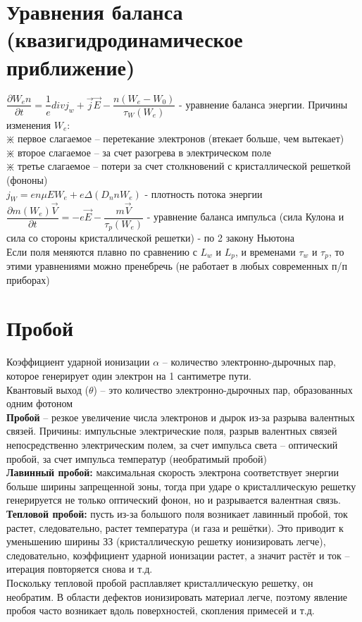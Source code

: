 \begin{multicols*}{2}
		\section{Уравнения баланса (квазигидродинамическое приближение)}
		$\dfrac{\partial W_e n}{\partial t} = \dfrac{1}{e} div j_w + \vec{j}\vec{E} - \dfrac{n(W_e - W_0)}{\tau_W(W_e)}$ - уравнение баланса энергии. Причины изменения $W_e$:\\
		$\divideontimes$ первое слагаемое – перетекание электронов (втекает больше, чем вытекает)\\
		$\divideontimes$ второе слагаемое – за счет разогрева в электрическом поле\\
		$\divideontimes$ третье слагаемое – потери за счет столкновений с кристаллической решеткой (фононы)\\
		$j_W = en \mu E W_e + e \Delta(D_n n W_e)$ - плотность потока энергии\\
		$\dfrac{\partial m (W_e) \vec{V}}{\partial t} = -e\vec{E} - \dfrac{m\vec{V}}{\tau_p(W_e)}$ - уравнение баланса импульса (сила Кулона и сила со стороны кристаллической решетки) - по 2 закону Ньютона \\
		Если поля меняются плавно по сравнению с $L_w$ и $L_p$, и временами $\tau_w$ и $\tau_p$, то этими уравнениями можно пренебречь (не работает в любых современных п/п приборах)

		\section{Пробой}
		Коэффициент ударной ионизации $\alpha$ – количество электронно-дырочных пар, которое генерирует один электрон на 1 сантиметре пути.\\
		Квантовый выход ($\theta$) – это количество электронно-дырочных пар, образованных одним фотоном\\
		\textbf{Пробой} – резкое увеличение числа электронов и дырок из-за разрыва валентных связей. Причины: импульсные электрические поля, разрыв валентных связей непосредственно электрическим полем, за счет импульса света – оптический пробой, за счет импульса температур (необратимый пробой)\\
		\textbf{Лавинный пробой:} максимальная скорость электрона соответствует энергии больше ширины запрещенной зоны,	тогда при ударе о кристаллическую решетку генерируется не только оптический фонон, но и	разрывается валентная связь.\\
		\textbf{Тепловой пробой:} пусть из-за большого поля возникает лавинный пробой, ток растет, следовательно, растет температура (и газа и решётки). Это приводит к уменьшению ширины ЗЗ (кристаллическую решетку ионизировать легче), следовательно, коэффициент ударной ионизации растет, а значит растёт и ток – итерация повторяется снова и т.д.\\
		Поскольку тепловой пробой расплавляет кристаллическую решетку, он необратим. В области дефектов ионизировать материал легче, поэтому явление пробоя часто возникает вдоль поверхностей, скопления примесей и т.д.


\end{multicols*}

